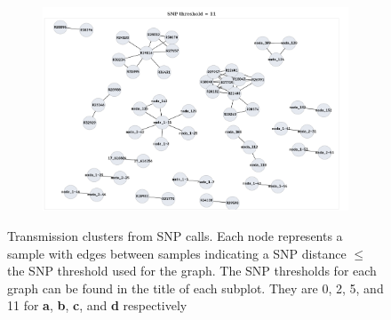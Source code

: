 \begin{figure}
\begin{subfigure}[b]{0.45\textwidth}
         \caption{}
     \end{subfigure}
     \hfill
     \begin{subfigure}[b]{0.45\textwidth}
         \centering
         \includegraphics[width=\textwidth]{Appendix1/Figs/bcftools_clusters_t11.png}
         \caption{}
     \end{subfigure}
        \caption{Transmission clusters from \bcftools{} SNP calls. Each node represents a sample with edges between samples indicating a SNP distance $\le$ the SNP threshold used for the graph. The SNP thresholds for each graph can be found in the title of each subplot. They are 0, 2, 5, and 11 for \textbf{a}, \textbf{b}, \textbf{c}, and \textbf{d} respectively}
        \label{fig:bcftools-original-clusters}
\end{figure}

